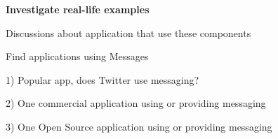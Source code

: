 \documentclass[Screen16to9,17pt]{foils}
\begin{document}
\inputminted[fontsize=\footnotesize]{python}{programs/recv.py}




{\bf Investigate real-life examples}

Discussions about application that use these components

Find applications using Messages

1) Popular app, does Twitter use messaging?

2) One commercial application using or providing messaging

3) One Open Source application using or providing messaging



\slidenext
\end{document}
